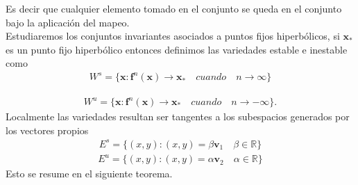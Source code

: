 Es decir que cualquier elemento tomado en el conjunto se queda en el conjunto bajo la aplicación del mapeo. \\
Estudiaremos los conjuntos invariantes asociados a puntos fijos hiperbólicos, si $\pmb x_{*}$ es un punto fijo hiperbólico entonces definimos las variedades estable e inestable como
\begin{eqnarray}
W^{s}=\lbrace \pmb x : \mathbf{f}^{n}(\pmb x)\rightarrow \pmb x_{*} \quad cuando \quad n\rightarrow \infty \rbrace
\label{variedad estable}
\end{eqnarray}

\begin{eqnarray}
W^{u}=\lbrace \pmb x : \mathbf{f}^{n}(\pmb x)\rightarrow \pmb x_{*} \quad cuando \quad n\rightarrow -\infty \rbrace.
\label{variedad inestable}
\end{eqnarray}
Localmente las variedades resultan ser tangentes a los subespacios generados por los vectores propios
\begin{eqnarray*}
E^{s}=\lbrace (x,y) : (x,y)=\beta \pmb v_{1} \quad \beta\in \mathbb{R}\rbrace
\end{eqnarray*}
\begin{eqnarray*}
E^{u}=\lbrace (x,y) : (x,y)=\alpha \pmb v_{2}\quad \alpha\in \mathbb{R}\rbrace
\end{eqnarray*}
Esto se resume en el siguiente teorema.



